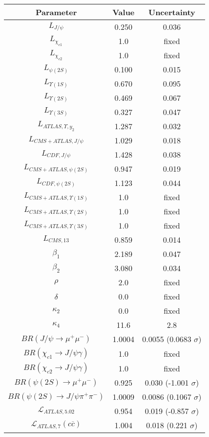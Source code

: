 \begin{table}[h!]
\centering
\begin{tabular}{c|c|c}
Parameter & Value & Uncertainty \\
\hline
$L_{J/\psi}$ & 0.250 & 0.036 \\
$L_{\chi_{c1}}$ & 1.0 & fixed \\
$L_{\chi_{c2}}$ & 1.0 & fixed \\
$L_{\psi(2S)}$ & 0.100 & 0.015 \\
$L_{\Upsilon(1S)}$ & 0.670 & 0.095 \\
$L_{\Upsilon(2S)}$ & 0.469 & 0.067 \\
$L_{\Upsilon(3S)}$ & 0.327 & 0.047 \\
$L_{ATLAS,\Upsilon,y_2}$ & 1.287 & 0.032 \\
$L_{CMS+ATLAS,J/\psi}$ & 1.029 & 0.018 \\
$L_{CDF,J/\psi}$ & 1.428 & 0.038 \\
$L_{CMS+ATLAS,\psi(2S)}$ & 0.947 & 0.019 \\
$L_{CDF,\psi(2S)}$ & 1.123 & 0.044 \\
$L_{CMS+ATLAS,\Upsilon(1S)}$ & 1.0 & fixed \\
$L_{CMS+ATLAS,\Upsilon(2S)}$ & 1.0 & fixed \\
$L_{CMS+ATLAS,\Upsilon(3S)}$ & 1.0 & fixed \\
$L_{CMS,13}$ & 0.859 & 0.014 \\
$\beta_1$ & 2.189 & 0.047 \\
$\beta_2$ & 3.080 & 0.034 \\
$\rho$ & 2.0 & fixed \\
$\delta$ & 0.0 & fixed \\
$\kappa_2$ & 0.0 & fixed \\
$\kappa_4$ & 11.6 & 2.8 \\
$BR(J/\psi\rightarrow\mu^+\mu^-)$ & 1.0004 & 0.0055 (0.0683 $\sigma$) \\
$BR(\chi_{c1}\rightarrow J/\psi\gamma)$ & 1.0 & fixed \\
$BR(\chi_{c2}\rightarrow J/\psi\gamma)$ & 1.0 & fixed \\
$BR(\psi(2S)\rightarrow\mu^+\mu^-)$ & 0.925 & 0.030 (-1.001 $\sigma$) \\
$BR(\psi(2S)\rightarrow J/\psi\pi^+\pi^-)$ & 1.0009 & 0.0086 (0.1067 $\sigma$) \\
$\mathcal L_{ATLAS,5.02}$ & 0.954 & 0.019 (-0.857 $\sigma$) \\
$\mathcal L_{ATLAS,7}(c\overline c)$ & 1.004 & 0.018 (0.221 $\sigma$) \\

\end{tabular}
\end{table}
